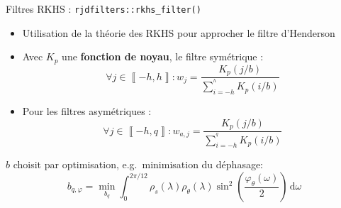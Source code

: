 \documentclass[10pt,xcolor=table,color={dvipsnames,usenames},ignorenonframetext,usepdftitle=false,french]{beamer}
\providecommand{\tightlist}{%
  \setlength{\parskip}{0pt}
  }
\newcommand\1{\mathds{1}}
\newcommand\ud{\,\mathrm{d}}
\begin{document}
\begin{frame}{Filtres RKHS : \texttt{rjdfilters::rkhs\_filter()}}
\protect\hypertarget{filtres-rkhs-rjdfiltersrkhs_filter}{}
\begin{itemize}
\item
  Utilisation de la théorie des RKHS pour approcher le filtre
  d'Henderson
\item
  Avec \(K_p\) une \textbf{fonction de noyau}, le filtre symétrique : \[
  \forall j\in\left\llbracket -h,h\right\rrbracket: w_{j}=\frac{K_p(j/b)}{\sum_{i=-h}^{^h}K_p(i/b)}
  \]
\end{itemize}


\pause

\begin{itemize}
\tightlist
\item
  Pour les filtres asymétriques : \[
  \forall j\in\left\llbracket -h,q\right\rrbracket: w_{a,j}=\frac{K_p(j/b)}{\sum_{i=-h}^{^q}K_p(i/b)}
  \]
\end{itemize}

\pause\pause\faArrowCircleRight{} \(b\) choisit par optimisation,
e.g.~minimisation du déphasage: \[b_{q,\varphi}=\underset{b_q}{\min}
\int_{0}^{2\pi/12}
\rho_s(\lambda)\rho_\theta(\lambda)\sin^{2}\left(\frac{\varphi_\theta(\omega)}{2}\right)\ud \omega\]
\end{frame}
\end{document}
